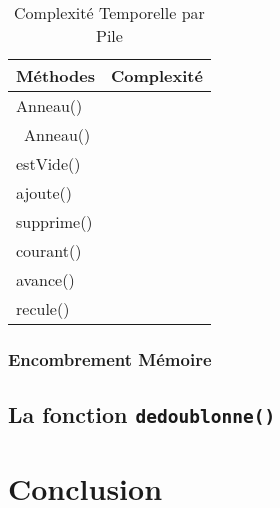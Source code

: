 \documentclass{article}
\newcommand{\info}{\texttt}
\begin{document}
        \begin{table}[H]
        \centering
        \caption{Complexité Temporelle par Pile}
        \label{ComplexitePile}
        \begin{tabular}{|l|l|}
        \hline
        \rowcolor[HTML]{C0C0C0} 
        {\color[HTML]{333333} \textbf{Méthodes}} & \textbf{Complexité} \\ \hline
        Anneau()                                 &                     \\ \hline
        ~Anneau()                                &                     \\ \hline
        estVide()                                &                     \\ \hline
        ajoute()                                 &                     \\ \hline
        supprime()                               &                     \\ \hline
        courant()                                &                     \\ \hline
        avance()                                 &                     \\ \hline
        recule()                                 &                     \\ \hline
        \end{tabular}
        \end{table}
        
        \subsubsection{Encombrement Mémoire}
        
    \subsection{La fonction \info{dedoublonne()}}
    
        
\section{Conclusion}


\newpage
\tableofcontents
\end{document}
